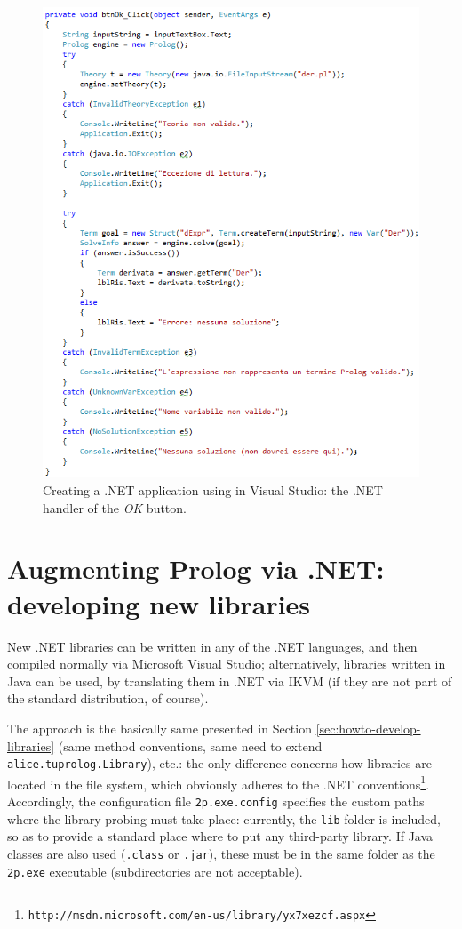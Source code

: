 \begin{figure}
\centering
  \includegraphics[width=12cm]{images/dotnet-visualstudio4}
  \caption{Creating a .NET application using \tuprolog{} in Visual Studio: the .NET handler of the \textit{OK} button.}\label{fig:dotnet-visualstudio4}
\end{figure}


\section{Augmenting Prolog via .NET:\\developing new libraries}
\label{sec:dotnet-developing new libraries}

New \tuprolog{}.NET libraries can be written in any of the .NET languages, and then compiled normally via Microsoft Visual Studio; alternatively, libraries written in Java can be used, by translating them in .NET via IKVM (if they are not part of the standard \tuprolog{} distribution, of course).

The approach is the basically same presented in Section \ref{sec:howto-develop-libraries} (same method conventions, same need to extend \texttt{alice.tuprolog.Library}), etc.: the only difference concerns how libraries are located in the file system, which obviously adheres to the .NET conventions\footnote{
\texttt{http://msdn.microsoft.com/en-us/library/yx7xezcf.aspx}}.
Accordingly, the configuration file \texttt{2p.exe.config} specifies the custom paths where the library probing must take place: currently, the \texttt{lib} folder is included, so as to provide a standard place where to put any third-party library.
%
If Java classes are also used (\texttt{.class} or \texttt{.jar}), these must be in the same folder as the \texttt{2p.exe} executable (subdirectories are not acceptable).

